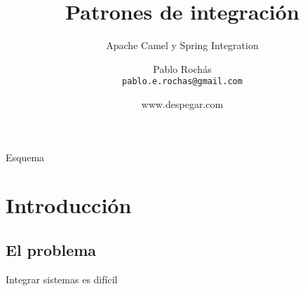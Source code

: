 \documentclass{beamer}
\title{Patrones de integración}
\subtitle{Apache Camel y Spring Integration}
\author[Despegar]{Pablo Rochás\\ \texttt{pablo.e.rochas@gmail.com}}
\date[Despegar]{www.despegar.com}
\begin{document}
\begin{frame}
\titlepage
\end{frame}

\begin{frame}{Esquema}
  \tableofcontents
\end{frame}

\section{Introducción}
\subsection{El problema}
\begin{frame}{Integrar sistemas es difícil}

\end{frame}

\end{document}
